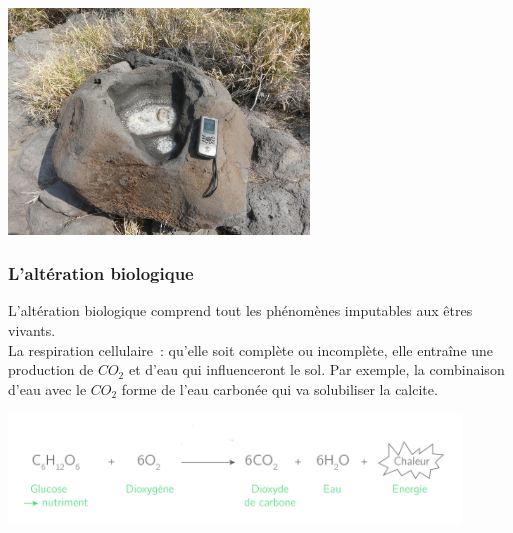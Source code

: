 \documentclass[a4paper,11pt]{article}
\begin{document}
\begin{itemize}
  \medbreak
  \begin{center}
    \includegraphics[width=8cm]{Images/Erosion/Haloclastie_vasque_basalte_Hawaii.jpg}
  \end{center}
  \medbreak

\end{itemize}

\subsubsection{L'altération biologique}

L'altération biologique comprend tout les phénomènes imputables aux êtres vivants. \\
La respiration cellulaire~: qu'elle soit complète ou incomplète, elle entraîne une production de $CO_2$ et d'eau qui influenceront le sol.
Par exemple, la combinaison d'eau avec le $CO_2$ forme de l'eau carbonée qui va solubiliser la calcite.

\begin{center}
  \includegraphics[width=12cm]{Images/Erosion/Respiration_cellulaire.png}
\end{center}
\end{document}
